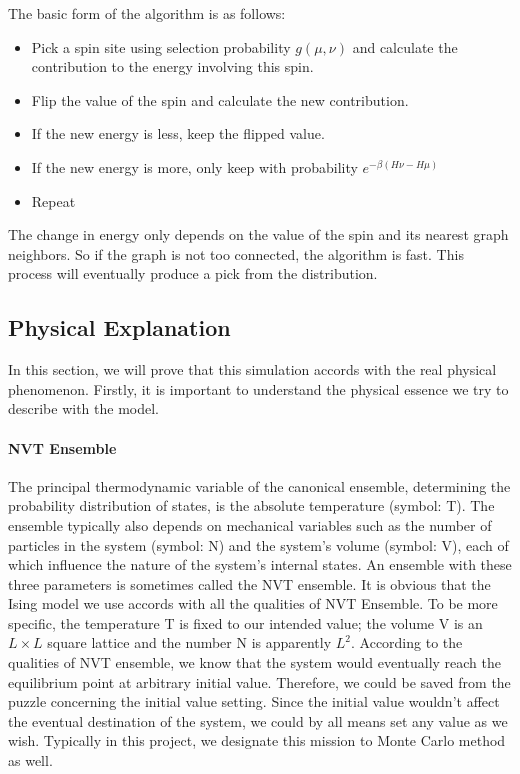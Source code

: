 \documentclass[prl,aps,twocolumn]{revtex4}
\begin{document}
    The basic form of the algorithm is as follows:
    \begin{itemize}
      \item Pick a spin site using selection probability $g(\mu,\nu)$ and calculate the contribution to the energy involving this spin.
      \item Flip the value of the spin and calculate the new contribution.
      \item If the new energy is less, keep the flipped value.
      \item If the new energy is more, only keep with probability $e^{-\beta(H\nu-H\mu)}$
      \item Repeat
    \end{itemize}
    The change in energy only depends on the value of the spin and its nearest graph neighbors. So if the graph is not too connected, the algorithm is fast. This process will eventually produce a pick from the distribution.
    \subsection{Physical Explanation}

    In this section, we will prove that this simulation accords with the real physical phenomenon. Firstly, it is important to understand the physical essence we try to describe with the model.
    \paragraph{NVT Ensemble}The principal thermodynamic variable of the canonical ensemble, determining the probability distribution of states, is the absolute temperature (symbol: T). The ensemble typically also depends on mechanical variables such as the number of particles in the system (symbol: N) and the system's volume (symbol: V), each of which influence the nature of the system's internal states. An ensemble with these three parameters is sometimes called the NVT ensemble.
    \indent It is obvious that the Ising model we use accords with all the qualities of NVT Ensemble. To be more specific, the temperature T is fixed to our intended value; the volume V is an $L\times L$ square lattice and the number N is apparently $L^2$.
    \indent According to the qualities of NVT ensemble, we know that the system would eventually reach the equilibrium point at arbitrary initial value. Therefore, we could be saved from the puzzle concerning the initial value setting. Since the initial value wouldn't affect the eventual destination of the system, we could by all means set any value as we wish. Typically in this project, we designate this mission to Monte Carlo method as well.
\end{document}
